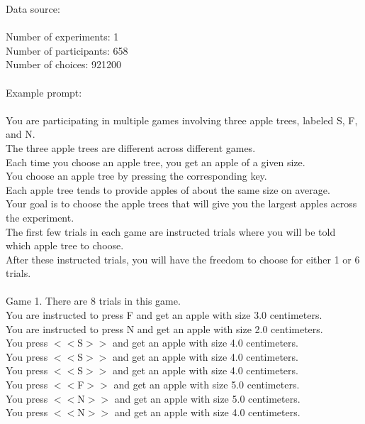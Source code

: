 \documentclass[pdflatex,sn-nature]{sn-jnl}%
\theoremstyle{thmstyleone}%
\theoremstyle{thmstyletwo}%
\theoremstyle{thmstylethree}%
\begin{document}
Data source: \cite{dubois2022value} \\ $~$ \\
Number of experiments: 1 $~$\\ 
Number of participants: 658 $~$\\ 
Number of choices: 921200 $~$\\ 
 $~$\\ 
Example prompt: $~$\\ 
 $~$\\ 
 You are participating in multiple games involving three apple trees, labeled S, F, and N. $~$\\ 
The three apple trees are different across different games. $~$\\ 
Each time you choose an apple tree, you get an apple of a given size. $~$\\ 
You choose an apple tree by pressing the corresponding key. $~$\\ 
Each apple tree tends to provide apples of about the same size on average. $~$\\ 
Your goal is to choose the apple trees that will give you the largest apples across the experiment. $~$\\ 
The first few trials in each game are instructed trials where you will be told which apple tree to choose. $~$\\ 
After these instructed trials, you will have the freedom to choose for either 1 or 6 trials. $~$\\ 
 $~$\\ 
Game 1. There are 8 trials in this game. $~$\\ 
You are instructed to press F and get an apple with size 3.0 centimeters. $~$\\ 
You are instructed to press N and get an apple with size 2.0 centimeters. $~$\\ 
You press $<<$S$>>$ and get an apple with size 4.0 centimeters. $~$\\ 
You press $<<$S$>>$ and get an apple with size 4.0 centimeters. $~$\\ 
You press $<<$S$>>$ and get an apple with size 4.0 centimeters. $~$\\ 
You press $<<$F$>>$ and get an apple with size 5.0 centimeters. $~$\\ 
You press $<<$N$>>$ and get an apple with size 5.0 centimeters. $~$\\ 
You press $<<$N$>>$ and get an apple with size 4.0 centimeters. $~$\\ 
 $~$\\ 
\end{document}
